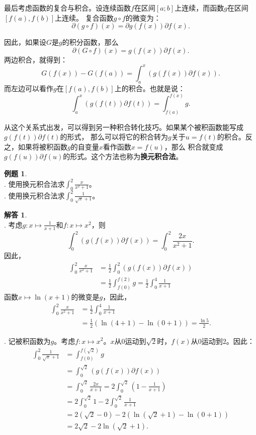\documentclass[12pt,UTF8]{ctexbook}
\theoremstyle{definition}
\newtheorem{et}{例题}[section]
\newtheorem*{so}{解答}
\theoremstyle{plain}
\begin{document}
最后考虑函数的复合与积合。设连续函数$f$在区间$[a; b]$上连续，而函数$g$在区间$[f(a), f(b)]$上连续。
复合函数$g\circ f$的微变为：
$$ \partial (g \circ f) (x) = \partial g(f(x)) \partial f (x). $$

因此，如果设$G$是$g$的积分函数，那么
$$ \partial (G \circ f) (x) = g(f(x)) \partial f (x). $$
两边积合，就得到：
$$ G(f(x)) - G(f(a)) = \int_a^x \left( g(f(x)) \partial f (x) \right).$$
而左边可以看作$g$在$[f(a), f(b)]$上的积合。也就是说：
$$ \int_a^x \left( g(f(t)) \partial f (t) \right) = \int_{f(a)}^{f(x)} g.$$

从这个关系式出发，可以得到另一种积合转化技巧。如果某个被积函数能写成$g(f(t)) \partial f (t)$的形式，
那么可以将它的积合转为$g$关于$u = f(t)$的积合。反之，如果将被积函数$g$的自变量$x$看作函数$x = f(u)$，那么
积合就变成$g(f(u)) \partial f (u)$的形式。这个方法也称为\textbf{换元积合法}。

\begin{et}
    \mbox{} \\
    . 使用换元积合法求$\int_0^2 \frac{x}{x^2 + 1}$。 \\
    . 使用换元积合法求$\int_0^2 \frac{1}{\sqrt{x} + 1}$。
\end{et}

\begin{so}
    \mbox{} \\
    . 考虑$g: x\mapsto \frac{1}{x + 1}$和$f: x\mapsto x^2$，则
    $$ \int_0^2 \left( g(f(x)) \partial f (x) \right) = \int_0^2 \frac{2x}{x^2 + 1}. $$
    因此，
    \begin{align*}
        \int_0^2 \frac{x}{x^2 + 1} &= \frac{1}{2} \int_0^2 \left( g(f(x)) \partial f (x) \right) \\
        &= \frac{1}{2}\int_{f(0)}^{f(2)} g = \frac{1}{2}\int_0^4 \frac{1}{x + 1} 
    \end{align*}
    函数$x\mapsto \ln{(x + 1)}$的微变是$g$，因此，
    \begin{align*}
        \int_0^2 \frac{x}{x^2 + 1} &= \frac{1}{2}\int_0^4 \frac{1}{x + 1} \\
        &= \frac{1}{2}\left(\ln{(4 + 1)} - \ln{(0 + 1)}\right) = \frac{\ln{5}}{2}.
    \end{align*}

    . 记被积函数为$g$。考虑$f: x\mapsto x^2$。$x$从$0$运动到$\sqrt{2}$时，$f(x)$从$0$运动到$2$。因此：
    \begin{align*}
        \int_0^2 \frac{1}{\sqrt{x} + 1} &= \int_{f(0)}^{f(\sqrt{2})} g \\
        &= \int_0^{\sqrt{2}} \left( g(f(x)) \partial f (x) \right) \\
        &= \int_0^{\sqrt{2}} \frac{2x}{x + 1} = 2\int_0^{\sqrt{2}} \left( 1 - \frac{1}{x + 1} \right) \\
        &= 2\int_0^{\sqrt{2}} 1 - 2\int_0^{\sqrt{2}} \frac{1}{x + 1} \\
        &= 2(\sqrt{2} - 0) - 2 \left(\ln{(\sqrt{2} + 1)} - \ln{(0 + 1)}\right) \\
        &= 2\sqrt{2} - 2\ln{(\sqrt{2} + 1)}.
    \end{align*}
\end{so}
\end{document}
